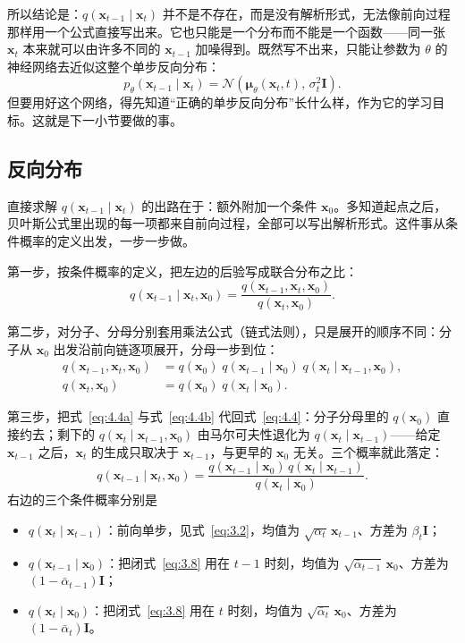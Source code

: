 \documentclass[UTF8,a4paper,12pt]{ctexart}
\numberwithin{equation}{section}
\begin{document}
所以结论是：$q(\bm{x}_{t-1}\mid\bm{x}_t)$ 并不是不存在，而是没有解析形式，无法像前向过程那样用一个公式直接写出来。它也只能是一个分布而不能是一个函数——同一张 $\bm{x}_t$ 本来就可以由许多不同的 $\bm{x}_{t-1}$ 加噪得到。既然写不出来，只能让参数为 $\theta$ 的神经网络去近似这整个单步反向分布：
\begin{equation}\label{eq:4.3}
p_\theta(\bm{x}_{t-1}\mid\bm{x}_t)
=\mathcal{N}\!\left(\bm{\mu}_\theta(\bm{x}_t,t),\,\sigma_t^2\bm{I}\right).
\end{equation}
但要用好这个网络，得先知道“正确的单步反向分布”长什么样，作为它的学习目标。这就是下一小节要做的事。

\subsection{反向分布}

直接求解 $q(\bm{x}_{t-1}\mid\bm{x}_t)$ 的出路在于：额外附加一个条件 $\bm{x}_0$。多知道起点之后，贝叶斯公式里出现的每一项都来自前向过程，全部可以写出解析形式。这件事从条件概率的定义出发，一步一步做。

第一步，按条件概率的定义，把左边的后验写成联合分布之比：
\begin{equation}\label{eq:4.4}
q(\bm{x}_{t-1}\mid\bm{x}_t,\bm{x}_0)
=\frac{q(\bm{x}_{t-1},\bm{x}_t,\bm{x}_0)}{q(\bm{x}_t,\bm{x}_0)} .
\end{equation}

第二步，对分子、分母分别套用乘法公式（链式法则），只是展开的顺序不同：分子从 $\bm{x}_0$ 出发沿前向链逐项展开，分母一步到位：
\begin{align}
q(\bm{x}_{t-1},\bm{x}_t,\bm{x}_0)
&=q(\bm{x}_0)\;q(\bm{x}_{t-1}\mid\bm{x}_0)\;
q(\bm{x}_t\mid\bm{x}_{t-1},\bm{x}_0),
\label{eq:4.4a}\\[-2pt]
q(\bm{x}_t,\bm{x}_0)
&=q(\bm{x}_0)\;q(\bm{x}_t\mid\bm{x}_0).
\label{eq:4.4b}
\end{align}

第三步，把式~\eqref{eq:4.4a} 与式~\eqref{eq:4.4b} 代回式~\eqref{eq:4.4}：分子分母里的 $q(\bm{x}_0)$ 直接约去；剩下的 $q(\bm{x}_t\mid\bm{x}_{t-1},\bm{x}_0)$ 由马尔可夫性退化为 $q(\bm{x}_t\mid\bm{x}_{t-1})$——给定 $\bm{x}_{t-1}$ 之后，$\bm{x}_t$ 的生成只取决于 $\bm{x}_{t-1}$，与更早的 $\bm{x}_0$ 无关。三个概率就此落定：
\begin{equation}\label{eq:4.4c}
q(\bm{x}_{t-1}\mid\bm{x}_t,\bm{x}_0)
=\frac{q(\bm{x}_{t-1}\mid\bm{x}_0)\,q(\bm{x}_t\mid\bm{x}_{t-1})}{q(\bm{x}_t\mid\bm{x}_0)} .
\end{equation}
右边的三个条件概率分别是
\begin{itemize}
\item $q(\bm{x}_t\mid\bm{x}_{t-1})$：前向单步，见式~\eqref{eq:3.2}，均值为 $\sqrt{\alpha_t}\,\bm{x}_{t-1}$、方差为 $\beta_t\bm{I}$；
\item $q(\bm{x}_{t-1}\mid\bm{x}_0)$：把闭式~\eqref{eq:3.8} 用在 $t-1$ 时刻，均值为 $\sqrt{\bar{\alpha}_{t-1}}\,\bm{x}_0$、方差为 $(1-\bar{\alpha}_{t-1})\bm{I}$；
\item $q(\bm{x}_t\mid\bm{x}_0)$：把闭式~\eqref{eq:3.8} 用在 $t$ 时刻，均值为 $\sqrt{\bar{\alpha}_t}\,\bm{x}_0$、方差为 $(1-\bar{\alpha}_t)\bm{I}$。
\end{itemize}
\end{document}
